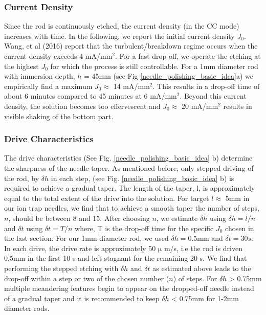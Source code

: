 \documentclass[%
 aip,
 amsmath,amssymb,
 reprint,%
]{revtex4-1}
\begin{document}
\subsubsection{Current Density}
Since the rod is continuously etched, the current density (in the CC mode) increases with time.
In the following, we report the initial current density $J_0$.
Wang, et al (2016) \cite{Wang2016} report that the turbulent/breakdown regime occurs when the current density exceeds 4 mA/mm$^2$.
For a fast drop-off, we operate the etching at the highest $J_0$ for which the process is still controllable.
For a 1mm diameter rod with immersion depth, $h$ = 45mm  (see Fig \ref{needle_polishing_basic_idea}a) we empirically find a maximum $J_0 \approx$ 14 mA/mm$^2$.
This results in a drop-off time of about 6 minutes compared to 45 minutes at 6 mA/mm$^2$.
Beyond this current density, the solution becomes too effervescent and  $J_0 \approx$ 20 mA/mm$^2$  results in visible shaking of the bottom part.


\subsubsection{Drive Characteristics}
The drive characteristics (See Fig. \ref{needle_polishing_basic_idea} b) determine the sharpness of the needle taper.
As mentioned before, only stepped driving of the rod, by $\delta h$ in each step, (see Fig. \ref{needle_polishing_basic_idea} b) is required to achieve a gradual taper.
The length of the taper, l, is approximately equal to the total extent of the drive into the solution.
For target $l\approx$ 5mm in our ion trap needles, we find that to achieve a smooth taper the number of steps, $n$, should be between 8 and 15.
After choosing $n$, we estimate $\delta h$ using $\delta h = l/n$ and $\delta t$ using $\delta t = T/n$ where, T is the drop-off time for the specific $J_0$ chosen in the last section.
For our 1mm diameter rod, we used  $\delta h=0.5$mm and $\delta t=30 s$.
In each drive, the drive rate is approximately 50 $\mathrm{\mu}$ m/s, i.e the rod is driven 0.5mm in the first 10 s and left stagnant for the remaining 20 s.
We find that performing the stepped etching with $\delta h$ and $\delta t$ as estimated above leads to the drop-off within a step or two of the chosen number ($n$) of steps.
For $\delta h$ > 0.75mm multiple meandering features begin to appear on the dropped-off needle instead of a gradual taper and it is recommended to keep $\delta h$ < 0.75mm for 1-2mm diameter rods.
\end{document}
